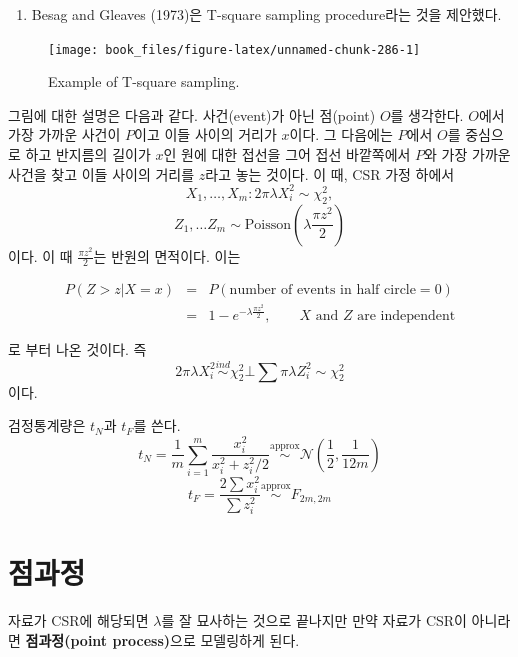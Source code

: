 \documentclass[b5paper,]{scrbook}
\providecommand{\tightlist}{%
  \setlength{\itemsep}{0pt}\setlength{\parskip}{0pt}}
\theoremstyle{plain}
\theoremstyle{definition}
\numberwithin{equation}{section}
\begin{document}
\begin{enumerate}
\def\labelenumi{\arabic{enumi}.}
\setcounter{enumi}{1}
\tightlist
\item
  Besag and Gleaves (1973)은 T-square sampling procedure라는 것을
  제안했다.
\end{enumerate}

\begin{figure}

{\centering \texttt{[image: book\_files/figure-latex/unnamed-chunk-286-1]} 

}

\caption{Example of T-square sampling.}\label{fig:unnamed-chunk-286}
\end{figure}

그림에 대한 설명은 다음과 같다. 사건(event)가 아닌 점(point) \(O\)를
생각한다. \(O\)에서 가장 가까운 사건이 \(P\)이고 이들 사이의 거리가
\(x\)이다. 그 다음에는 \(P\)에서 \(O\)를 중심으로 하고 반지름의 길이가
\(x\)인 원에 대한 접선을 그어 접선 바깥쪽에서 \(P\)와 가장 가까운 사건을
찾고 이들 사이의 거리를 \(z\)라고 놓는 것이다. 이 때, CSR 가정 하에서
\[X_{1}, \ldots, X_{m}: 2\pi\lambda X_{i}^{2} \sim \chi_{2}^{2},\]
\[Z_{1}, \ldots Z_{m} \sim \text{Poisson}(\lambda \frac{\pi z^{2}}{2})\]
이다. 이 때 \(\frac{\pi z^{2}}{2}\)는 반원의 면적이다. 이는

\begin{eqnarray*}
P(Z>z|X=x)&=& P(\text{number of events in half circle}=0)\\
&=& 1-e^{-\lambda \frac{\pi z^{2}}{2}}, \qquad{X \text{ and } Z \text{ are independent}}
\end{eqnarray*}

로 부터 나온 것이다. 즉
\[2\pi\lambda X_{i}^{2} \stackrel{ind}{\sim} \chi_{2}^{2} \bot \sum \pi\lambda Z_{i}^{2} \sim \chi_{2}^{2}\]
이다.

검정통계량은 \(t_{N}\)과 \(t_{F}\)를 쓴다.
\[t_{N}=\frac{1}{m}\sum_{i=1}^{m}\frac{x_{i}^{2}}{x_{i}^{2} + z_{i}^{2}/2} \stackrel{\text{approx}}{\sim}\mathcal{N}(\frac{1}{2}, \frac{1}{12m})\]
\[t_{F}=\frac{2\sum x_{i}^{2}}{\sum z_{i}^2} \stackrel{\text{approx}}{\sim} F_{2m,2m}\]

\chapter{점과정}\label{pointprocess}

자료가 CSR에 해당되면 \(\lambda\)를 잘 묘사하는 것으로 끝나지만 만약
자료가 CSR이 아니라면 \textbf{점과정(point process)}으로 모델링하게
된다.
\end{document}
